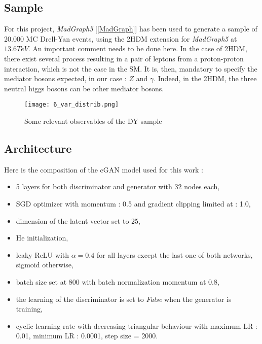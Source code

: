 \documentclass [12pt] {article}
\numberwithin{equation}{section} %
\numberwithin{figure}{section}   %
\begin{document}
\subsection{Sample}

For this project, \textit{MadGraph5} [\ref{MadGraph}] has been used to generate a sample of 20.000 MC Drell-Yan events, using the 2HDM extension for \textit{MadGraph5} at $13.6 TeV$. An important comment needs to be done here. In the case of 2HDM, there exist several process resulting in a pair of leptons from a proton-proton interaction, which is not the case in the SM. It is, then, mandatory to specify the mediator bosons expected, in our case : $Z$ and $\gamma$. Indeed, in the 2HDM, the three neutral higgs bosons can be other mediator bosons.

\begin{figure}[H]
    \centering
    \texttt{[image: 6\_var\_distrib.png]}
    \caption{Some relevant observables of the DY sample}
    \label{fig:enter-label}
\end{figure}

\subsection{Architecture}

Here is the composition of the cGAN model used for this work :
\begin{itemize}
    \item 5 layers for both discriminator and generator with 32 nodes each,
    \item SGD optimizer with momentum : 0.5 and gradient clipping limited at : 1.0,
    \item dimension of the latent vector set to 25,
    \item He initialization,
    \item leaky ReLU with $\alpha = 0.4$ for all layers except the last one of both networks, sigmoid otherwise,
    \item batch size set at 800 with batch normalization momentum at 0.8,
    \item the learning of the discriminator is set to \textit{False} when the generator is training,
    \item cyclic learning rate with decreasing triangular behaviour with maximum LR : 0.01, minimum LR : 0.0001, step size = 2000.
\end{itemize}
\end{document}
